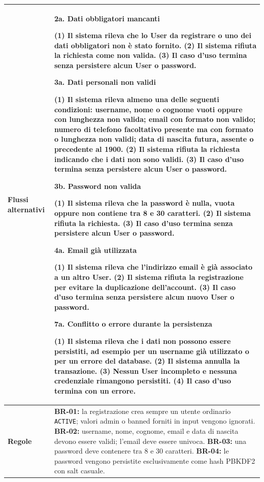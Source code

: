 \begin{tabularx}{\textwidth}{>{\columncolor{etichetteUC}\raggedright\arraybackslash\sffamily\bfseries\color{black!75}}p{2.5cm}>{\raggedright\arraybackslash}X}
Flussi alternativi & \textbf{2a. Dati obbligatori mancanti} \par (1) Il sistema rileva che lo User da registrare o uno dei dati obbligatori non è stato fornito. (2) Il sistema rifiuta la richiesta come non valida. (3) Il caso d'uso termina senza persistere alcun User o password. \par\vspace{1pt} \textbf{3a. Dati personali non validi} \par (1) Il sistema rileva almeno una delle seguenti condizioni: \textbullet{} username, nome o cognome vuoti oppure con lunghezza non valida; \textbullet{} email con formato non valido; \textbullet{} numero di telefono facoltativo presente ma con formato o lunghezza non validi; \textbullet{} data di nascita futura, assente o precedente al 1900. (2) Il sistema rifiuta la richiesta indicando che i dati non sono validi. (3) Il caso d'uso termina senza persistere alcun User o password. \par\vspace{1pt} \textbf{3b. Password non valida} \par (1) Il sistema rileva che la password è nulla, vuota oppure non contiene tra 8 e 30 caratteri. (2) Il sistema rifiuta la richiesta. (3) Il caso d'uso termina senza persistere alcun User o password. \par\vspace{1pt} \textbf{4a. Email già utilizzata} \par (1) Il sistema rileva che l'indirizzo email è già associato a un altro User. (2) Il sistema rifiuta la registrazione per evitare la duplicazione dell'account. (3) Il caso d'uso termina senza persistere alcun nuovo User o password. \par\vspace{1pt} \textbf{7a. Conflitto o errore durante la persistenza} \par (1) Il sistema rileva che i dati non possono essere persistiti, ad esempio per un username già utilizzato o per un errore del database. (2) Il sistema annulla la transazione. (3) Nessun User incompleto e nessuna credenziale rimangono persistiti. (4) Il caso d'uso termina con un errore. \\[2pt] \hline
Regole & \textbullet{} \textbf{BR-01:} la registrazione crea sempre un utente ordinario \texttt{ACTIVE}; valori admin o banned forniti in input vengono ignorati. \textbullet{} \textbf{BR-02:} username, nome, cognome, email e data di nascita devono essere validi; l'email deve essere univoca. \textbullet{} \textbf{BR-03:} una password deve contenere tra 8 e 30 caratteri. \textbullet{} \textbf{BR-04:} le password vengono persistite esclusivamente come hash PBKDF2 con salt casuale. \\[2pt] \hline

\end{tabularx}
